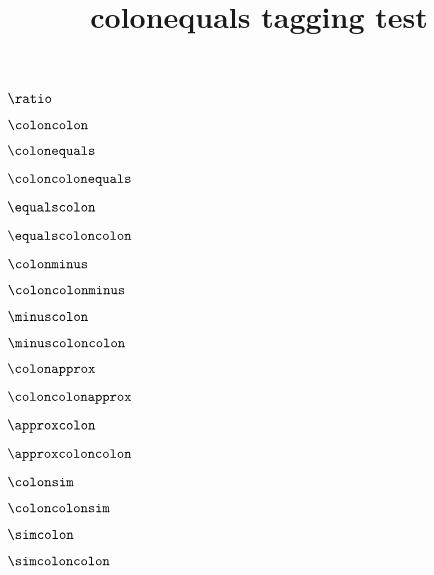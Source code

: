 \documentclass{article}
\title{colonequals tagging test}
\begin{document}
$\ratio$\par
$\coloncolon$\par
$\colonequals$\par
$\coloncolonequals$\par
$\equalscolon$\par
$\equalscoloncolon$\par
$\colonminus$\par
$\coloncolonminus$\par
$\minuscolon$\par
$\minuscoloncolon$\par
$\colonapprox$\par
$\coloncolonapprox$\par
$\approxcolon$\par
$\approxcoloncolon$\par
$\colonsim$\par
$\coloncolonsim$\par
$\simcolon$\par
$\simcoloncolon$\par
\end{document}
